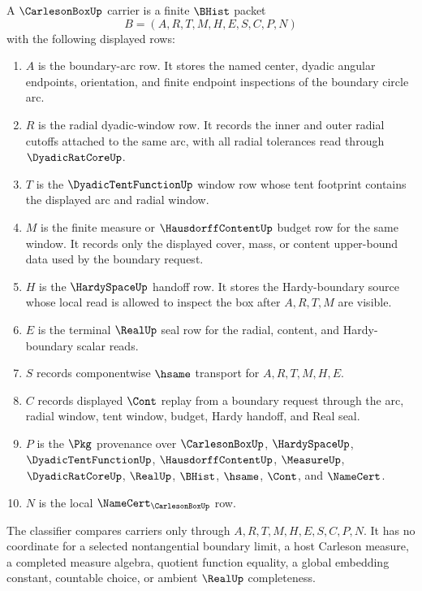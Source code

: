 \begin{definition}
\label{def:carleson-box-carrier}
A $\CarlesonBoxUp$ carrier is a finite $\BHist$ packet
$$
B=(A,R,T,M,H,E,S,C,P,N)
$$
with the following displayed rows:
\begin{enumerate}
\item $A$ is the boundary-arc row. It stores the named center, dyadic angular endpoints, orientation, and finite endpoint inspections of the boundary circle arc.
\item $R$ is the radial dyadic-window row. It records the inner and outer radial cutoffs attached to the same arc, with all radial tolerances read through $\DyadicRatCoreUp$.
\item $T$ is the $\DyadicTentFunctionUp$ window row whose tent footprint contains the displayed arc and radial window.
\item $M$ is the finite measure or $\HausdorffContentUp$ budget row for the same window. It records only the displayed cover, mass, or content upper-bound data used by the boundary request.
\item $H$ is the $\HardySpaceUp$ handoff row. It stores the Hardy-boundary source whose local read is allowed to inspect the box after $A,R,T,M$ are visible.
\item $E$ is the terminal $\RealUp$ seal row for the radial, content, and Hardy-boundary scalar reads.
\item $S$ records componentwise $\hsame$ transport for $A,R,T,M,H,E$.
\item $C$ records displayed $\Cont$ replay from a boundary request through the arc, radial window, tent window, budget, Hardy handoff, and Real seal.
\item $P$ is the $\Pkg$ provenance over $\CarlesonBoxUp$, $\HardySpaceUp$, $\DyadicTentFunctionUp$, $\HausdorffContentUp$, $\MeasureUp$, $\DyadicRatCoreUp$, $\RealUp$, $\BHist$, $\hsame$, $\Cont$, and $\NameCert$.
\item $N$ is the local $\NameCert_{\CarlesonBoxUp}$ row.
\end{enumerate}
The classifier compares carriers only through $A,R,T,M,H,E,S,C,P,N$. It has no coordinate for a selected nontangential boundary limit, a host Carleson measure, a completed measure algebra, quotient function equality, a global embedding constant, countable choice, or ambient $\RealUp$ completeness.
\end{definition}

